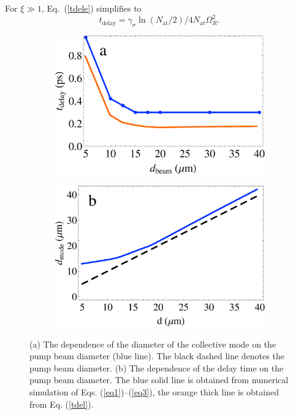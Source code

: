 \documentclass[aps,pra,amsmath,amssymb,onecolumn,superscriptaddress,showpacs,floatfix,]{revtex4-1}
\begin{document}
For $\xi \gg 1$, Eq.~(\ref{tdele}) simplifies to  
\begin{equation} 
{t_{\text{delay}}} = {\gamma _\sigma }\ln \left( {{N_{\text{at}}}/2} \right)/4{N_{\text{at}}}\Omega _R^2. \label{tdel}
\end{equation}

\begin{figure}[h]
	\centering
	\begin{subfigure}[h]{0.45\linewidth}
		\includegraphics[width=\linewidth]{Fig5a.eps}
	\end{subfigure}
	\begin{subfigure}[h]{0.45\linewidth}
		\includegraphics[width=\linewidth]{Fig5b.eps}
	\end{subfigure}
	\caption{(a) The dependence of the diameter of the collective mode on the pump beam diameter (blue line). The black dashed line denotes the pump beam diameter. (b) The dependence of the delay time on the pump beam diameter. The blue solid line is obtained from numerical simulation of Eqs. (\ref{eq1})--(\ref{eq3}), the orange thick line is obtained from Eq. (\ref{tdel}).
	}
	\label{fig5}
\end{figure}
\end{document}
